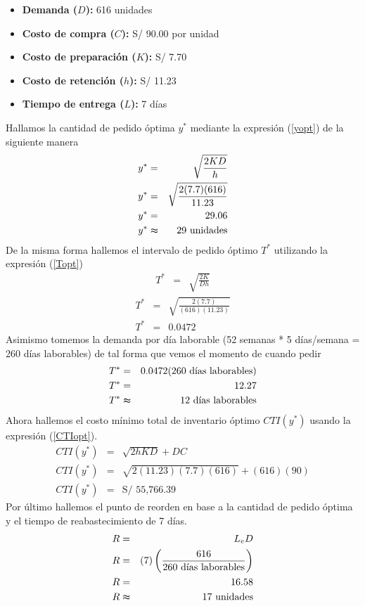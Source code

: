 \begin{itemize}
    \item \textbf{Demanda ($D$):} 616 unidades
    \item \textbf{Costo de compra ($C$):} S/ 90.00 por unidad
    \item \textbf{Costo de preparación ($K$):} S/ 7.70
    \item \textbf{Costo de retención ($h$):} S/ 11.23
    \item \textbf{Tiempo de entrega ($L$):} 7 días
\end{itemize}

Hallamos la cantidad de pedido óptima $y^*$ mediante la expresión (\ref{yopt}) de la siguiente manera
\begin{eqnarray}
    y^* &=& \sqrt{\frac{2KD}{h}} \nonumber \\
    y^* &=& \sqrt{\frac{2(7.7)(616)}{11.23}} \nonumber \\
    y^* &=& 29.06 \nonumber \\
    y^* &\thickapprox& 29 \text{ unidades} \nonumber
\end{eqnarray}
De la misma forma hallemos el intervalo de pedido óptimo $T^*$ utilizando la expresión (\ref{Topt}) 
\begin{eqnarray}
    T^* &=& \sqrt{\frac{2K}{Dh}} \nonumber
\end{eqnarray}
\begin{eqnarray}
    T^* &=& \sqrt{\frac{2(7.7)}{(616)(11.23)}} \nonumber \\
    T^* &=& 0.0472 \nonumber
\end{eqnarray}
Asimismo tomemos la demanda por día laborable (52 semanas * 5 días/semana = 260 días laborables) de tal forma que vemos el momento de cuando pedir
\begin{eqnarray}
    T^* &=& 0.0472 (260 \text{ días laborables}) \nonumber \\   
    T^* &=& 12.27 \nonumber \\
    T^* &\thickapprox& 12 \text{ días laborables} \nonumber
\end{eqnarray}
Ahora hallemos el costo mínimo total de inventario óptimo $CTI(y^*)$ usando la expresión (\ref{CTIopt}).
\begin{eqnarray}
    CTI(y^*) &=& \sqrt{2hKD} + DC \nonumber \\
    CTI(y^*) &=& \sqrt{2(11.23)(7.7)(616)} + (616)(90) \nonumber \\
    CTI(y^*) &=& \text{S/ 55,766.39} \nonumber
\end{eqnarray}
Por último hallemos el punto de reorden en base a la cantidad de pedido óptima y el tiempo de reabastecimiento de 7 días.
\begin{eqnarray}
    R &=& L_e D \nonumber \\
    R &=& (7) \left(\frac{616}{260 \text{ días laborables}} \right) \nonumber \\
    R &=& 16.58 \nonumber \\
    R &\thickapprox& 17 \text{ unidades} \nonumber
\end{eqnarray}


